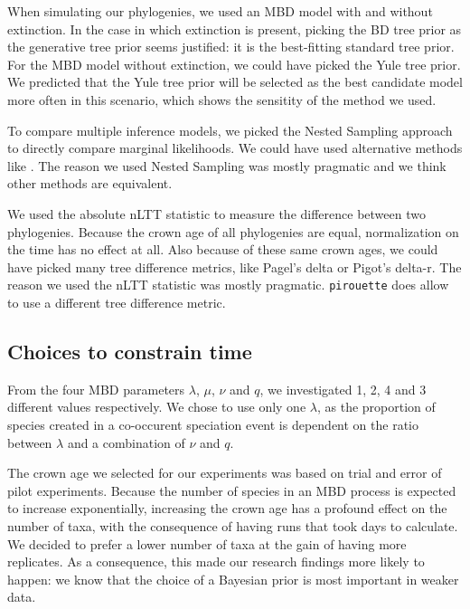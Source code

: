 When simulating our phylogenies, we used an MBD model with and without
extinction. In the case in which extinction is present,
picking the BD tree prior as the generative tree prior seems justified:
it is the best-fitting standard tree prior. For the MBD model without
extinction,  
we could have picked the Yule tree prior. We  predicted
that the Yule tree prior will be selected as the best candidate model
more often in this scenario, which shows the sensitity of the method we used.

To compare multiple inference models, we picked the Nested Sampling
approach to directly compare marginal likelihoods. We could have used
alternative methods like . The reason we used Nested
Sampling was mostly pragmatic and we think other methods are equivalent.

We used the absolute nLTT statistic to measure the difference between
two phylogenies. Because the crown age of all phylogenies are equal,
normalization on the time has no effect at all. Also because of these
same crown ages, we could have picked many tree difference metrics, like
 Pagel's delta or Pigot's delta-r. The reason we used
the nLTT statistic was mostly pragmatic. \verb;pirouette; does allow to 
use a different tree difference metric.

\subsection{Choices to constrain time}

From the four MBD parameters $\lambda$, $\mu$, $\nu$ and $q$,
we investigated 1, 2, 4 and 3 different values respectively.
We chose to use only one $\lambda$, as the proportion of species
created in a co-occurent speciation event is dependent on the ratio
between $\lambda$ and a combination of $\nu$ and $q$.  

The crown age we selected for our experiments was based on trial and error
of pilot experiments. Because the number of species in an MBD process is
expected to increase exponentially, increasing the crown age has a
profound effect on the number of taxa, with the consequence of having
runs that took days to calculate. We decided to prefer a lower number of
taxa at the gain of having more replicates. As a consequence, 
this made our research findings 
 more likely to happen: we know that the
choice of a Bayesian prior is most important in weaker data. 

